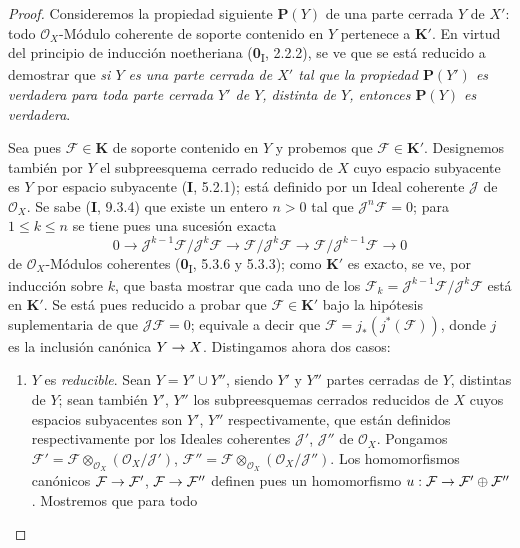 \documentclass[10pt,oneside,openany]{book}
\theoremstyle{egaenv}\newtheorem*{env}{---}
\theoremstyle{egastatement}
\theoremstyle{egadescription}
\renewcommand{\leq}{\leqslant}
\renewcommand{\to}{\mathchoice{\longrightarrow}{\rightarrow}{\rightarrow}{\rightarrow}}
\begin{document}
\begin{proof}
Consideremos la propiedad siguiente $\boldsymbol{P}(Y)$ de una parte cerrada $Y$ de $X'$:
todo $\mathcal O_X$-Módulo coherente de soporte contenido en $Y$ pertenece a
$\boldsymbol{K}'$. En virtud del principio de inducción noetheriana (\textbf{0}\textsubscript{I},
2.2.2), se ve que se está reducido a demostrar que \emph{si $Y$ es una parte
cerrada de $X'$ tal que la propiedad $\boldsymbol{P}(Y')$ es verdadera para toda parte
cerrada $Y'$ de $Y$, distinta de $Y$, entonces $\boldsymbol{P}(Y)$ es verdadera}.

Sea pues $\mathcal F\in\boldsymbol{K}$ de soporte contenido en $Y$ y probemos que
$\mathcal F\in\boldsymbol{K}'$. Designemos también por $Y$ el subpreesquema cerrado reducido de
$X$ cuyo espacio subyacente es $Y$ por espacio subyacente (\textbf{I}, 5.2.1); está definido por un Ideal coherente $\mathcal J$ de $\mathcal O_X$. Se sabe (\textbf{I}, 9.3.4) que existe un
entero $n>0$ tal que $\mathcal J^n\mathcal F=0$; para $1\leq k\leq n$ se tiene
pues una sucesión exacta
\[
0\longrightarrow
\mathcal J^{k-1}\mathcal F/\mathcal J^k\mathcal F
\longrightarrow \mathcal F/\mathcal J^k\mathcal F
\longrightarrow \mathcal F/\mathcal J^{k-1}\mathcal F
\longrightarrow0
\]
de $\mathcal O_X$-Módulos coherentes (\textbf{0}\textsubscript{I}, 5.3.6 y 5.3.3);
como $\boldsymbol{K}'$ es exacto, se ve, por inducción sobre $k$, que basta mostrar
que cada uno de los
$\mathcal F_k=\mathcal J^{k-1}\mathcal F/\mathcal J^k\mathcal F$ está en
$\boldsymbol{K}'$. Se está pues reducido a probar que $\mathcal F\in\boldsymbol{K}'$ bajo la hipótesis
suplementaria de que $\mathcal J\mathcal F=0$; equivale a decir que
$\mathcal F=j_*(j^*(\mathcal F))$, donde $j$ es la inclusión canónica
$Y\to X$. Distingamos ahora dos casos:
\begin{enumerate}
\item[\textit{a)}] $Y$ es \emph{reducible}. Sean $Y=Y'\cup Y''$, siendo $Y'$ y $Y''$
partes cerradas de $Y$, distintas de $Y$; sean también $Y'$,
$Y''$ los subpreesquemas cerrados reducidos de $X$ cuyos espacios
subyacentes son $Y'$, $Y''$ respectivamente, que están definidos respectivamente por
los Ideales coherentes $\mathcal J'$, $\mathcal J''$ de $\mathcal O_X$. Pongamos
$\mathcal F'=\mathcal F\otimes_{\mathcal O_X}
(\mathcal O_X/\mathcal J')$,
$\mathcal F''=\mathcal F\otimes_{\mathcal O_X}
(\mathcal O_X/\mathcal J'')$.
Los homomorfismos canónicos $\mathcal F\to\mathcal F'$,
$\mathcal F\to\mathcal F''$ definen pues un homomorfismo
$u:\mathcal F\to\mathcal F'\oplus\mathcal F''$. Mostremos que para todo

\end{enumerate}
\end{proof}
\end{document}
